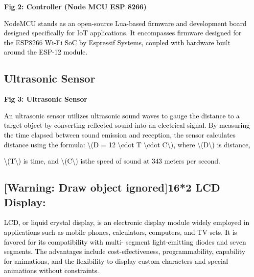 \documentclass[letterpaper]{article}
\begin{document}
\bigskip


\bigskip


\bigskip


\bigskip


\bigskip


\bigskip


\bigskip


\bigskip

\textbf{Fig 2: Controller (Node MCU ESP 8266)}

\textcolor{black}{NodeMCU stands as an open-source Lua-based firmware and development board designed specifically for
IoT applications. It encompasses firmware designed for the ESP8266 Wi-Fi SoC by Espressif Systems, coupled with
hardware built around the ESP-12 module.}


\bigskip


\bigskip

\subsection{Ultrasonic Sensor}

\bigskip


\bigskip


\bigskip


\bigskip


\bigskip


\bigskip


\bigskip


\bigskip

{\centering
\textbf{Fig 3: Ultrasonic Sensor}
\par}


\bigskip

\textcolor{black}{An ultrasonic sensor utilizes ultrasonic sound waves to gauge the distance to a target object by
converting reflected sound into an electrical signal. By measuring the time elapsed between sound emission and
reception, the sensor calculates distance using the formula: {\textbackslash}(D = 12 {\textbackslash}cdot T
{\textbackslash}cdot C{\textbackslash}), where {\textbackslash}(D{\textbackslash}) is distance,}

\textcolor{black}{{\textbackslash}(T{\textbackslash}) is time, and {\textbackslash}(C{\textbackslash}) isthe speed of
sound at 343 meters per second.}

\clearpage\setcounter{page}{1}\pagestyle{Convertedxvi}
\subsection[16*2 LCD Display:]{[Warning: Draw object ignored]16*2 LCD Display:}
\textcolor{black}{LCD, or liquid crystal display, is an electronic display module widely employed in applications such
as mobile phones, calculators, computers, and TV sets. It is favored for its compatibility with multi- segment
light-emitting diodes and seven segments. The advantages include cost-effectiveness, programmability, capability for
animations, and the flexibility to display custom characters and special animations without constraints.}
\end{document}
